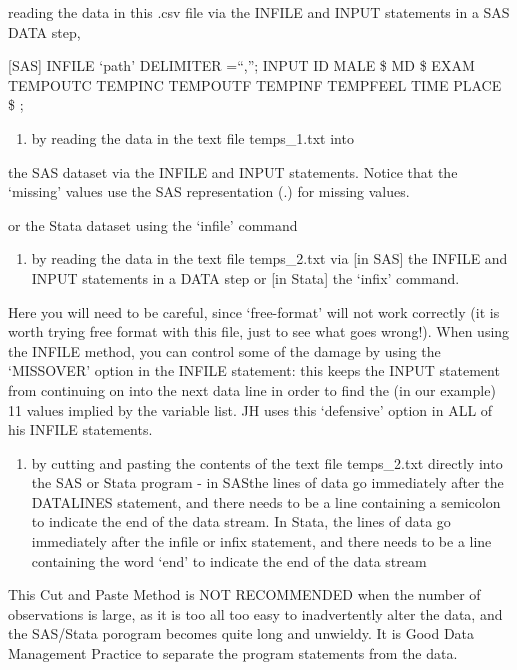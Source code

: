 \documentclass[]{book}
\providecommand{\tightlist}{%
  \setlength{\itemsep}{0pt}\setlength{\parskip}{0pt}}
\begin{document}
reading the data in this .csv file via the INFILE and INPUT statements in a SAS DATA step,

{[}SAS{]}
INFILE `path' DELIMITER =``,'';
INPUT ID MALE \$ MD \$ EXAM TEMPOUTC TEMPINC TEMPOUTF TEMPINF TEMPFEEL TIME PLACE \$ ;

\begin{enumerate}
\def\labelenumi{(\roman{enumi})}
\setcounter{enumi}{2}
\tightlist
\item
  by reading the data in the text file temps\_1.txt into
\end{enumerate}

the SAS dataset via the INFILE and INPUT statements. Notice that the `missing' values use the SAS representation (.) for missing values.

or the Stata dataset using the `infile' command

\begin{enumerate}
\def\labelenumi{(\roman{enumi})}
\setcounter{enumi}{3}
\tightlist
\item
  by reading the data in the text file temps\_2.txt via {[}in SAS{]} the INFILE and INPUT statements in a DATA step or {[}in Stata{]} the `infix' command.
\end{enumerate}

Here you will need to be careful, since `free-format' will not work correctly (it is worth trying free format with this file, just to see what goes wrong!). When using the INFILE method, you can control some of the damage by using the `MISSOVER' option in the INFILE statement: this keeps the INPUT statement from continuing on into the next data line in order to find the (in our example) 11 values implied by the variable list. JH uses this `defensive' option in ALL of his INFILE statements.

\begin{enumerate}
\def\labelenumi{(\alph{enumi})}
\setcounter{enumi}{21}
\tightlist
\item
  by cutting and pasting the contents of the text file temps\_2.txt directly into the SAS or Stata program - in SASthe lines of data go immediately after the DATALINES statement, and there needs to be a line containing a semicolon to indicate the end of the data stream. In Stata, the lines of data go immediately after the infile or infix statement, and there needs to be a line containing the word `end' to indicate the end of the data stream
\end{enumerate}

This Cut and Paste Method is NOT RECOMMENDED when the number of observations is large, as it is too all too easy to inadvertently alter the data, and the SAS/Stata porogram becomes quite long and unwieldy. It is Good Data Management Practice to separate the program statements from the data.
\end{document}
